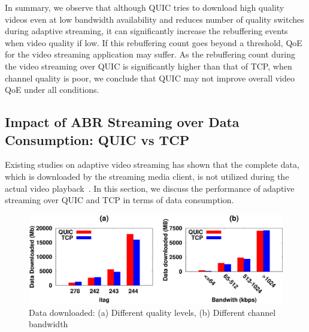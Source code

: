 In summary, we observe that although \ac{QUIC} tries to download high quality videos even at low bandwidth availability and reduces number of quality switches during adaptive streaming, it can significantly increase the rebuffering events when video quality if low. 
If this rebuffering count goes beyond a threshold, \ac{QoE} for the video streaming application may suffer. 
As the rebuffering count during the video streaming over \ac{QUIC} is significantly higher than that of \ac{TCP}, when channel quality is poor, we conclude that \ac{QUIC} may not improve overall video \ac{QoE} under all conditions. 

%

\subsection{Impact of ABR Streaming over Data Consumption: QUIC vs TCP}

Existing studies on adaptive video streaming has shown that the complete data, which is downloaded by the streaming media client, is not utilized during the actual video playback~\cite{krishnappa2013dashing}. 
In this section, we discuss the performance of adaptive streaming over \ac{QUIC} and \ac{TCP} in terms of data consumption. 

\begin{figure}[!t]
	\captionsetup[subfigure]{}
	\begin{center}
        \includegraphics[width=0.9\linewidth]{img/plotdata/CDF/downloaded/data_dowloaded_itag_bw}
		\caption{\label{fig:data_download}Data downloaded: (a) Different quality levels, (b) Different channel bandwidth}
	\end{center}
\end{figure}


